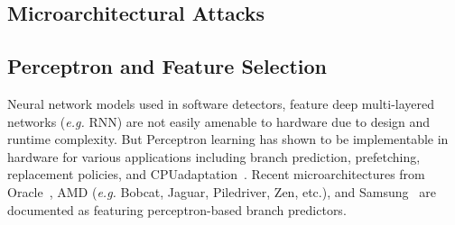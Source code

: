 
\subsection{Microarchitectural Attacks}

\subsection{Perceptron and Feature Selection}

 


Neural network models used in software detectors, feature deep multi-layered  networks ({\em e.g.} RNN) are not easily amenable to hardware due to design and runtime complexity. But Perceptron learning has shown to be implementable in hardware for various  applications including branch prediction, prefetching, replacement policies, and CPUadaptation~\cite{intelISCA2019}. Recent microarchitectures from Oracle~\cite{SPARCT4}, AMD ({\em e.g.} Bobcat, Jaguar, Piledriver, Zen, etc.), and Samsung~\cite{Mongoose,M3} are documented as featuring perceptron-based branch predictors.


